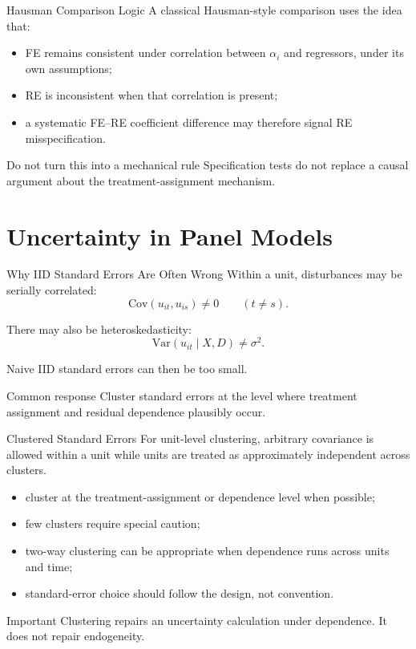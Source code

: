 \documentclass[aspectratio=169,11pt]{beamer}
\newcommand{\Var}{\mathrm{Var}}
\newcommand{\Cov}{\mathrm{Cov}}
\begin{document}
\begin{frame}{Hausman Comparison Logic}
A classical Hausman-style comparison uses the idea that:
\begin{itemize}
\item FE remains consistent under correlation between \(\alpha_i\) and regressors, under its own assumptions;
\item RE is inconsistent when that correlation is present;
\item a systematic FE--RE coefficient difference may therefore signal RE misspecification.
\end{itemize}

\begin{alertblock}{Do not turn this into a mechanical rule}
Specification tests do not replace a causal argument about the treatment-assignment mechanism.
\end{alertblock}
\end{frame}

\section{Uncertainty in Panel Models}

\begin{frame}{Why IID Standard Errors Are Often Wrong}
Within a unit, disturbances may be serially correlated:
\[
\Cov(u_{it},u_{is})\neq 0
\qquad (t\neq s).
\]

There may also be heteroskedasticity:
\[
\Var(u_{it}\mid X,D)\neq \sigma^2.
\]

Naive IID standard errors can then be too small.

\begin{block}{Common response}
Cluster standard errors at the level where treatment assignment and residual dependence plausibly occur.
\end{block}
\end{frame}

\begin{frame}{Clustered Standard Errors}
For unit-level clustering, arbitrary covariance is allowed within a unit while units are treated as approximately independent across clusters.

\begin{itemize}
\item cluster at the treatment-assignment or dependence level when possible;
\item few clusters require special caution;
\item two-way clustering can be appropriate when dependence runs across units and time;
\item standard-error choice should follow the design, not convention.
\end{itemize}

\begin{alertblock}{Important}
Clustering repairs an uncertainty calculation under dependence. It does not repair endogeneity.
\end{alertblock}
\end{frame}
\end{document}
